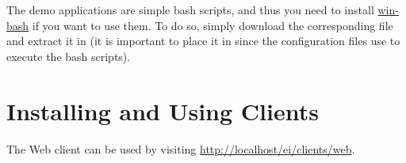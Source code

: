The demo applications are simple bash scripts, and thus you need to
install \href{http://win-bash.sourceforge.net/}{win-bash} if you want to
use them. To do so, simply download the corresponding  file
and extract it in  (it is important to
place it in  since the configuration
files use  to
execute the bash scripts).

\section{Installing and Using \ei Clients}
\label{ch:installation:installing-clients}

The Web client can be used by visiting
\url{http://localhost/ei/clients/web}. 


